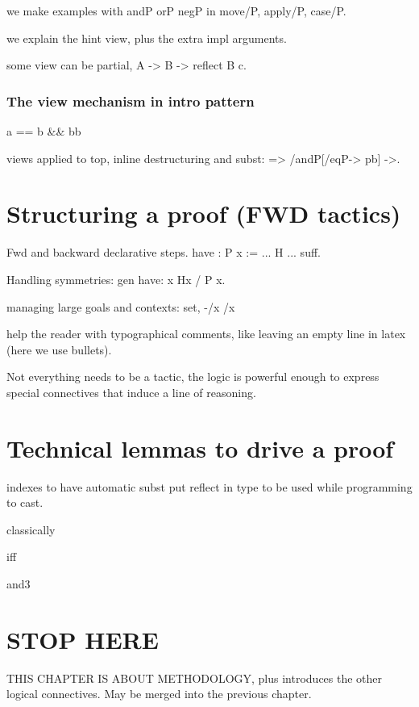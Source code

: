 we make examples with andP orP negP in move/P, apply/P, case/P.

we explain the hint view, plus the extra impl arguments.

some view can be partial, A -> B -> reflect B c.

\subsubsection{The view mechanism in intro pattern}

  a == b \&\& bb

views applied to top, inline destructuring and subst:
  => /andP[/eqP-> pb] ->.

\section{Structuring a proof (FWD tactics)}

Fwd and backward declarative steps.
have : P x := ... H ...
suff.

Handling symmetries:
gen have: x Hx / P x.

managing large goals and contexts: set, -/x /x 

help the reader with typographical comments, like leaving an empty
line in latex (here we use bullets).

Not everything needs to be a tactic, the logic is powerful
enough to express special connectives that induce a line of
reasoning.

\section{Technical lemmas to drive a proof}

indexes to have automatic subst
put reflect in type to be used while programming to cast.

classically

iff

and3

\section{STOP HERE}

THIS CHAPTER IS ABOUT METHODOLOGY, plus introduces the other logical
connectives. May be merged into the previous chapter.


%

